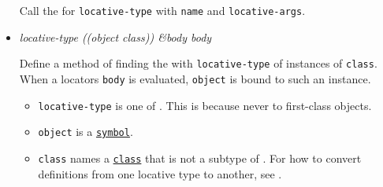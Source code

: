 \begin{itemize}
  Call the
  for \texttt{locative-type} with \texttt{name} and
  \texttt{locative-args}.
\item
  \label{x-28DREF-EXT-3ADEFINE-LOCATOR-20MGL-PAX-3AMACRO-29}
  \emph{locative-type ((object class)) \&body body}

  Define a method of finding the
  with \texttt{locative-type} of instances of \texttt{class}. When a
  locator\textquotesingle s \texttt{body} is evaluated, \texttt{object}
  is bound to such an instance.

\begin{Shaded}
\begin{Highlighting}[]
\NormalTok{ ((} \NormalTok{))}
\NormalTok{  (}  \NormalTok{ (} \NormalTok{))}
\end{Highlighting}
\end{Shaded}

  \begin{itemize}
  \item
    \texttt{locative-type} is one of
    .
    This is because
    never 
    to first-class objects.
  \item
    \texttt{object} is a
    \href{http://www.lispworks.com/documentation/HyperSpec/Body/t_symbol.htm}{\texttt{symbol}}.
  \item
    \texttt{class} names a
    \href{http://www.lispworks.com/documentation/HyperSpec/Body/t_class.htm}{\texttt{class}}
    that is not a subtype of
    . For how to
    convert definitions from one locative type to another, see
    .
  \end{itemize}


\end{itemize}
